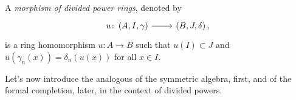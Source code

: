 \documentclass[../Main]{subfiles}
\begin{document}
\begin{defn}
	A {\em morphism of divided power rings}, denoted by
	\begin{equation*}
	\begin{tikzcd}[row sep = 0ex
		,/tikz/column 1/.append style={anchor=base east}
		,/tikz/column 2/.append style={anchor=base west}]
		u\colon \left(A, I, \gamma\right) 
		\arrow[r, "", rightarrow] &
		\left(B, J, \delta\right)
	,\end{tikzcd}
	\end{equation*} 
	is a ring homomorphism $u\colon A \to B$ such that
	$u(I) \subset J$ and $u(\gamma_n(x)) = \delta_n(u(x))$
	for all $x \in I$.
\end{defn}


\noindent
Let's now introduce the analogous of the symmetric algebra, first,
and of the formal completion, later,
in the context of divided powers.
\end{document}
